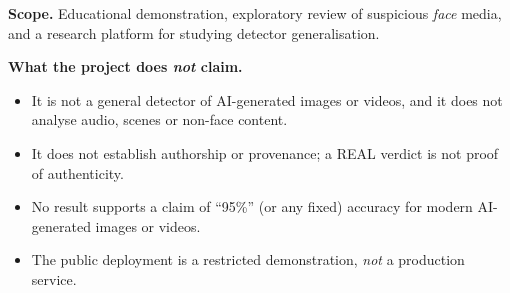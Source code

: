 \documentclass[11pt,a4paper]{report}
\begin{document}
\textbf{Scope.} Educational demonstration, exploratory review of suspicious \emph{face} media, and a research platform for studying detector generalisation.

\textbf{What the project does \emph{not} claim.}
\begin{itemize}
\item It is not a general detector of AI-generated images or videos, and it does not analyse audio, scenes or non-face content.
\item It does not establish authorship or provenance; a REAL verdict is not proof of authenticity.
\item No result supports a claim of ``95\%'' (or any fixed) accuracy for modern AI-generated images or videos.
\item The public deployment is a restricted demonstration, \emph{not} a production service.
\end{itemize}
\end{document}
